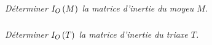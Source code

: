 \documentclass[10pt,fleqn]{article} %
\begin{document}
\begin{multicols}{2}
\begin{corrige}
\end{corrige}
\else
\fi

\subparagraph{}
\textit{Déterminer $I_{O}\left( M\right)$  la matrice d'inertie du moyeu $M$.}
\ifprof
\begin{corrige}
 
\end{corrige}
\else
\fi


\subparagraph{}
\textit{Déterminer $I_{O}\left( T\right)$  la matrice d'inertie du triaxe $T$.}
\ifprof
\begin{corrige}
 
\end{corrige}
\else
\fi
%
%
%

%
%
%
%
%
%
%
%
%
%
%




\ifprof
\else
\end{multicols}
\fi
\end{document}
